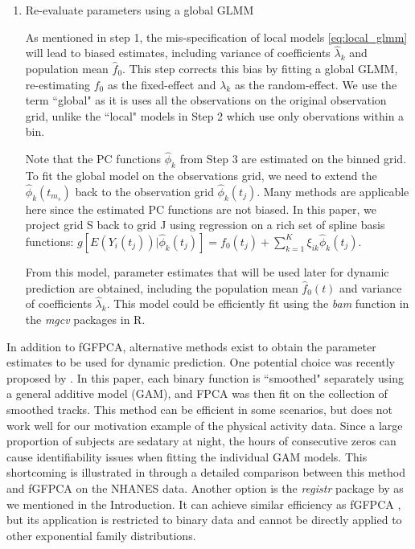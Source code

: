 \documentclass[12pt]{article}
\begin{document}
\begin{enumerate}
    \item Re-evaluate parameters using a global GLMM

As mentioned in step 1, the mis-specification of local models \ref{eq:local_glmm} will lead to biased estimates, including variance of coefficients $\hat{\lambda}_k$ and population mean $\hat{f}_0$. This step corrects this bias by fitting a global GLMM, re-estimating $f_0$ as the fixed-effect and $\lambda_k$ as the random-effect. We use the term ``global" as it is uses all the observations on the original observation grid, unlike the ``local" models in Step 2 which use only obervations within a bin. 

Note that the PC functions $\hat{\phi}_k$ from Step 3 are estimated on the binned grid. To fit the global model on the observations grid, we need to extend the $\hat{\phi}_k(t_{m_s})$ back to the observation grid $\hat{\phi}_k(t_j)$. Many methods are applicable here since the estimated PC functions are not biased. In this paper, we project grid S back to grid J using regression on a rich set of spline basis functions: $
g[E(Y_i(t_j))|\hat{\phi}_k(t_j)] = f_0(t_j)+\sum_{k=1}^K \xi_{ik}\hat{\phi}_k(t_j)
$.

From this model, parameter estimates that will be used later for dynamic prediction are obtained, including the population mean $\hat{f}_0(t)$ and variance of coefficients $\hat{\lambda}_k$. This model could be efficiently fit using the \textit{bam} function in the \textit{mgcv} packages in R. 
\end{enumerate}

In addition to fGFPCA, alternative methods exist to obtain the parameter estimates to be used for dynamic prediction. One potential choice was recently proposed by \citet{weishampel2023}. In this paper, each binary function is ``smoothed" separately using a general additive model (GAM), and FPCA was then fit on the collection of smoothed tracks. This method can be efficient in some scenarios, but does not work well for our motivation example of the physical activity data. Since a large proportion of subjects are sedatary at night, the hours of consecutive zeros can cause identifiability issues when fitting the individual GAM models. This shortcoming is illustrated in \citet{leroux2022} through a detailed comparison between this method and fGFPCA on the NHANES data. Another option is the \textit{registr} package by \citet{Wrobel2018} as we mentioned in the Introduction. It can achieve similar efficiency as fGFPCA \cite{fGFPCA}, but its application is restricted to binary data and cannot be directly applied to other exponential family distributions.
\end{document}
